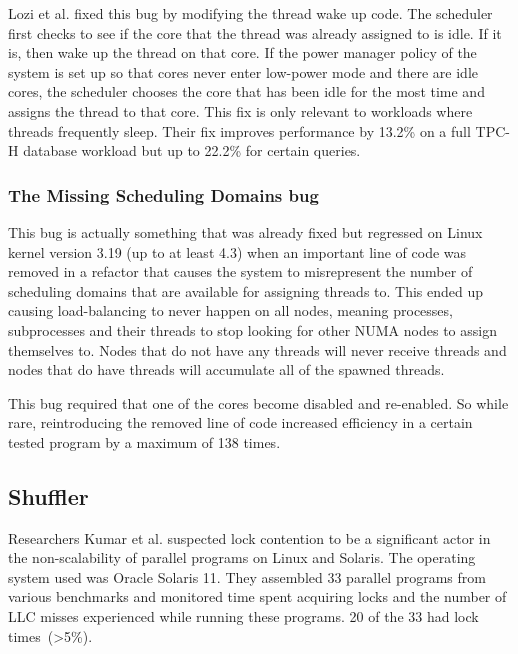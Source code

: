 \documentclass{sig-alternate}
\begin{document}
Lozi et al. fixed this bug by modifying the thread wake up code. The scheduler first checks to see if the core that the thread was already assigned to is idle. If it is, then wake up the thread on that core. If the power manager policy of the system is set up so that cores never enter low-power mode and there are idle cores, the scheduler chooses the core that has been idle for the most time and assigns the thread to that core. This fix is only relevant to workloads where threads frequently sleep. Their fix improves performance by 13.2\% on a full TPC-H database workload but up to 22.2\% for certain queries.~\cite{Lozi:2016}

\subsubsection{The Missing Scheduling Domains bug}
\label{sec:cfsfault_missingsched}

This bug is actually something that was already fixed but regressed on Linux kernel version 3.19 (up to at least 4.3) when an important line of code was removed in a refactor that causes the system to misrepresent the number of scheduling domains that are available for assigning threads to. This ended up causing load-balancing to never happen on all nodes, meaning processes, subprocesses and their threads to stop looking for other NUMA nodes to assign themselves to. Nodes that do not have any threads will never receive threads and nodes that do have threads will accumulate all of the spawned threads.

This bug required that one of the cores become disabled and re-enabled. So while rare, reintroducing the removed line of code increased efficiency in a certain tested program by a maximum of 138 times.~\cite{Lozi:2016}

\subsection{Shuffler}
\label{sec:shuffler}

Researchers Kumar et al. suspected lock contention to be a significant actor in the non-scalability of parallel programs on Linux and Solaris. The operating system used was Oracle Solaris 11. They assembled 33 parallel programs from various benchmarks and monitored time spent acquiring locks and the number of LLC misses experienced while running these programs. 20 of the 33 had lock times~(>5\%).
\end{document}
